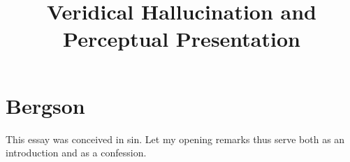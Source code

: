 \documentclass[12pt]{article}
\title{Veridical Hallucination and Perceptual Presentation}
\author{\myauthor}
\date{} %
\begin{document}
\maketitle

\setlength{\parindent}{1em}


\section{Bergson} %
\label{sec:bergson}

This essay was conceived in sin. Let my opening remarks thus serve both as an introduction and as a confession.
\end{document}
